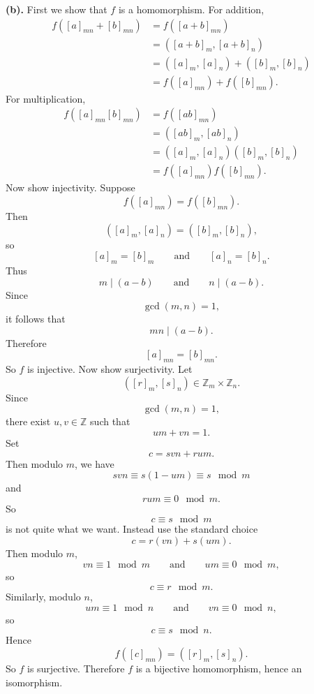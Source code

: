 \begin{problem}
    \textbf{(b).}
    First we show that $f$ is a homomorphism.
    For addition,
    \begin{align*}
        f([a]_{mn}+[b]_{mn})
        &=
        f([a+b]_{mn})\\
        &=
        ([a+b]_m,[a+b]_n)\\
        &=
        ([a]_m,[a]_n)+([b]_m,[b]_n)\\
        &=
        f([a]_{mn})+f([b]_{mn}).
    \end{align*}
    For multiplication,
    \begin{align*}
        f([a]_{mn}[b]_{mn})
        &=
        f([ab]_{mn})\\
        &=
        ([ab]_m,[ab]_n)\\
        &=
        ([a]_m,[a]_n)([b]_m,[b]_n)\\
        &=
        f([a]_{mn})f([b]_{mn}).
    \end{align*}
    Now show injectivity.
    Suppose
    \[
        f([a]_{mn})=f([b]_{mn}).
    \]
    Then
    \[
        ([a]_m,[a]_n)=([b]_m,[b]_n),
    \]
    so
    \[
        [a]_m=[b]_m
        \qquad\text{and}\qquad
        [a]_n=[b]_n.
    \]
    Thus
    \[
        m\mid (a-b)
        \qquad\text{and}\qquad
        n\mid (a-b).
    \]
    Since
    \[
        \gcd(m,n)=1,
    \]
    it follows that
    \[
        mn\mid (a-b).
    \]
    Therefore
    \[
        [a]_{mn}=[b]_{mn}.
    \]
    So $f$ is injective.
    Now show surjectivity.
    Let
    \[
        ([r]_m,[s]_n)\in \mathbb{Z}_m\times\mathbb{Z}_n.
    \]
    Since
    \[
        \gcd(m,n)=1,
    \]
    there exist $u,v\in\mathbb{Z}$ such that
    \[
        um+vn=1.
    \]
    Set
    \[
        c=svn+rum.
    \]
    Then modulo $m$, we have
    \[
        svn\equiv s(1-um)\equiv s\mod m
    \]
    and
    \[
        rum\equiv 0\mod m.
    \]
    So
    \[
        c\equiv s\mod m
    \]
    is not quite what we want.
    Instead use the standard choice
    \[
        c=r(vn)+s(um).
    \]
    Then modulo $m$,
    \[
        vn\equiv 1\mod m
        \qquad\text{and}\qquad
        um\equiv 0\mod m,
    \]
    so
    \[
        c\equiv r\mod m.
    \]
    Similarly, modulo $n$,
    \[
        um\equiv 1\mod n
        \qquad\text{and}\qquad
        vn\equiv 0\mod n,
    \]
    so
    \[
        c\equiv s\mod n.
    \]
    Hence
    \[
        f([c]_{mn})=([r]_m,[s]_n).
    \]
    So $f$ is surjective.
    Therefore $f$ is a bijective homomorphism, hence an isomorphism.
\end{problem}

